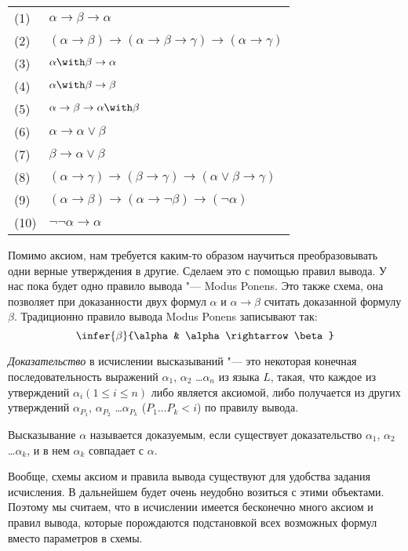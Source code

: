 \begin{tabular}{ll}
(1) & $\alpha \rightarrow \beta \rightarrow \alpha$ \\
(2) & $(\alpha \rightarrow \beta) \rightarrow (\alpha \rightarrow \beta \rightarrow \gamma) \rightarrow (\alpha \rightarrow \gamma)$ \\
(3) & $\alpha \with \beta \rightarrow \alpha$\\
(4) & $\alpha \with \beta \rightarrow \beta$\\
(5) & $\alpha \rightarrow \beta \rightarrow \alpha \with \beta$\\
(6) & $\alpha \rightarrow \alpha \vee \beta$\\
(7) & $\beta \rightarrow \alpha \vee \beta$\\
(8) & $(\alpha \rightarrow \gamma) \rightarrow (\beta \rightarrow \gamma) \rightarrow (\alpha \vee \beta \rightarrow \gamma)$\\
(9) & $(\alpha \rightarrow \beta) \rightarrow (\alpha \rightarrow \neg \beta) \rightarrow (\neg \alpha)$\\
(10) & $\neg \neg \alpha \rightarrow \alpha$
\end{tabular}

Помимо аксиом, нам требуется каким-то образом научиться преобразовывать одни верные утверждения
в другие.
Сделаем это с помощью правил вывода. У нас пока будет одно правило вывода "--- Modus Ponens.
Это также схема, она позволяет при доказанности двух формул $\alpha$ и $\alpha \rightarrow \beta$
считать доказанной формулу $\beta$. Традиционно правило вывода Modus Ponens записывают так:
$$\infer{\beta}{\alpha & \alpha \rightarrow \beta}$$

\begin{definition} \emph{Доказательство} в исчислении высказываний "--- 
это некоторая конечная последовательность выражений 
$\alpha_1$, $\alpha_2$ \dots $\alpha_n$
из языка $L$, такая, что каждое из утверждений $\alpha_i (1 \le i \le n)$
либо является аксиомой, либо получается из других
утверждений $\alpha_{P_1}$, $\alpha_{P_2}$ \dots $\alpha_{P_k}$ 
($P_1 \dots P_k < i$) по правилу вывода.
\end{definition}

\begin{definition} Высказывание $\alpha$ называется доказуемым, если 
существует доказательство $\alpha_1$, $\alpha_2$ \dots $\alpha_k$, и в нем
$\alpha_k$ совпадает с $\alpha$. 
\end{definition}

Вообще, схемы аксиом и правила вывода существуют для удобства задания
исчисления. В дальнейшем будет очень неудобно возиться с этими объектами.
Поэтому мы считаем, что в исчислении имеется бесконечно много аксиом и правил вывода,
которые порождаются подстановкой всех возможных формул вместо параметров в схемы.

